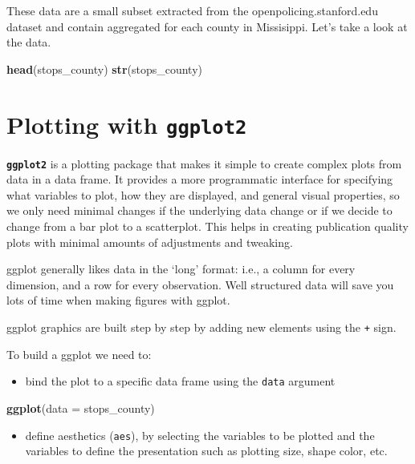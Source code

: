 \documentclass[]{book}
\newenvironment{Shaded}{\begin{snugshade}}{\end{snugshade}}
\newcommand{\KeywordTok}[1]{\textcolor[rgb]{0.13,0.29,0.53}{\textbf{#1}}}
\newcommand{\DataTypeTok}[1]{\textcolor[rgb]{0.13,0.29,0.53}{#1}}
\newcommand{\NormalTok}[1]{#1}
\providecommand{\tightlist}{%
  \setlength{\itemsep}{0pt}\setlength{\parskip}{0pt}}
\theoremstyle{definition}
\theoremstyle{definition}
\theoremstyle{definition}
\theoremstyle{remark}
\begin{document}
These data are a small subset extracted from the
openpolicing.stanford.edu dataset and contain aggregated for each county
in Missisippi. Let's take a look at the data.

\begin{Shaded}
\begin{Highlighting}[]
\KeywordTok{head}\NormalTok{(stops_county)}
\KeywordTok{str}\NormalTok{(stops_county)}
\end{Highlighting}
\end{Shaded}

\section{\texorpdfstring{Plotting with
\textbf{\texttt{ggplot2}}}{Plotting with ggplot2}}\label{plotting-with-ggplot2}

\textbf{\texttt{ggplot2}} is a plotting package that makes it simple to
create complex plots from data in a data frame. It provides a more
programmatic interface for specifying what variables to plot, how they
are displayed, and general visual properties, so we only need minimal
changes if the underlying data change or if we decide to change from a
bar plot to a scatterplot. This helps in creating publication quality
plots with minimal amounts of adjustments and tweaking.

ggplot generally likes data in the `long' format: i.e., a column for
every dimension, and a row for every observation. Well structured data
will save you lots of time when making figures with ggplot.

ggplot graphics are built step by step by adding new elements using the
\texttt{+} sign.

To build a ggplot we need to:

\begin{itemize}
\tightlist
\item
  bind the plot to a specific data frame using the \texttt{data}
  argument
\end{itemize}

\begin{Shaded}
\begin{Highlighting}[]
\KeywordTok{ggplot}\NormalTok{(}\DataTypeTok{data =}\NormalTok{ stops_county)}
\end{Highlighting}
\end{Shaded}

\begin{itemize}
\tightlist
\item
  define aesthetics (\texttt{aes}), by selecting the variables to be
  plotted and the variables to define the presentation such as plotting
  size, shape color, etc.
\end{itemize}
\end{document}
